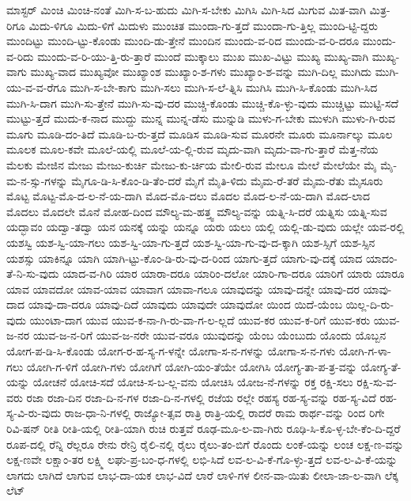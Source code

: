 {ಮಾಸ್ಟರ್
ಮಿಂಚಿ
ಮಿಂಚಿ-ನಂತೆ
ಮಿಗಿ-ಸ-ಬ-ಹುದು
ಮಿಗಿ-ಸ-ಬೇಕು
ಮಿಗಿಸಿ
ಮಿಗಿ-ಸಿದ
ಮಿಗುವ
ಮಿತ-ವಾಗಿ
ಮಿತ್ರ-ರಿಗೂ
ಮಿದು-ಳಿಗೂ
ಮಿದು-ಳಿಗೆ
ಮಿದುಳು
ಮುಂಚಿತ
ಮುಂದಾ-ಗು-ತ್ತದೆ
ಮುಂದಾ-ಗು-ತ್ತಿಲ್ಲ
ಮುಂದಿ-ಟ್ಟಿ-ದ್ದರು
ಮುಂದಿಟ್ಟು
ಮುಂದಿ-ಟ್ಟು-ಕೊಂಡು
ಮುಂದಿ-ಡು-ತ್ತೇನೆ
ಮುಂದಿನ
ಮುಂದು-ವ-ರಿದ
ಮುಂದು-ವ-ರಿ-ದರೂ
ಮುಂದು-ವ-ರಿದು
ಮುಂದು-ವ-ರಿ-ಯು-ತ್ತಿ-ರು-ತ್ತಾರೆ
ಮುಂದೆ
ಮುಕ್ಕಾಲು
ಮುಖ
ಮುಖ-ವಿಟ್ಟು
ಮುಖ್ಯ
ಮುಖ್ಯ-ವಾಗಿ
ಮುಖ್ಯ-ವಾಗು
ಮುಖ್ಯ-ವಾದ
ಮುಖ್ಯವೋ
ಮುಖ್ಯಾಂಶ
ಮುಖ್ಯಾಂ-ಶ-ಗಳು
ಮುಖ್ಯಾಂ-ಶ-ವನ್ನು
ಮುಗಿ-ದಿಲ್ಲ
ಮುಗಿದು
ಮುಗಿ-ಯು-ವ-ವ-ರೆಗೂ
ಮುಗಿ-ಸ-ಬೇ-ಕಾಗು
ಮುಗಿ-ಸಲು
ಮುಗಿ-ಸ-ಲೆ-ತ್ನಿಸಿ
ಮುಗಿಸಿ
ಮುಗಿ-ಸಿ-ಕೊಂಡು
ಮುಗಿ-ಸಿದ
ಮುಗಿ-ಸಿ-ದಾಗ
ಮುಗಿ-ಸು-ತ್ತೇನೆ
ಮುಗಿ-ಸು-ವು-ದರ
ಮುಚ್ಚಿ-ಕೊಂಡು
ಮುಚ್ಚಿ-ಕೊ-ಳ್ಳು-ವುದು
ಮುಚ್ಚಿಟ್ಟು
ಮುಟ್ಟಿ-ಸದೆ
ಮುಟ್ಟು-ತ್ತದೆ
ಮುದು-ಕ-ನಾದ
ಮುದ್ದು
ಮುನ್ನ
ಮುನ್ನ-ಡೆಸು
ಮುನ್ನುಡಿ
ಮುಳು-ಗ-ಬೇಕು
ಮುಳುಗಿ
ಮುಳು-ಗಿ-ರುವ
ಮೂಗು
ಮೂಡಿ-ದಂ-ತಿದೆ
ಮೂಡಿ-ಬ-ರು-ತ್ತದೆ
ಮೂಡಿಸ
ಮೂಡಿ-ಸುವ
ಮೂರನೇ
ಮೂರು
ಮೂರ್ನಾಲ್ಕು
ಮೂಲ
ಮೂಲಕ
ಮೂಲ-ಕವೇ
ಮೂಲೆ-ಯಲ್ಲಿ
ಮೂಲೆ-ಯ-ಲ್ಲಿ-ರುವ
ಮೃದು-ವಾಗಿ
ಮೃದು-ವಾ-ಗು-ತ್ತಾರೆ
ಮೆತ್ತ-ನೆಯ
ಮೆಲಕು
ಮೇಜಿನ
ಮೇಜು
ಮೇಜು-ಕುರ್ಚಿ
ಮೇಜು-ಕು-ರ್ಚಿಯ
ಮೇಲಿ-ರುವ
ಮೇಲೂ
ಮೇಲೆ
ಮೇಲೆಯೇ
ಮೈ
ಮೈ-ಮ-ನ-ಸ್ಸು-ಗಳನ್ನು
ಮೈಗೂ-ಡಿ-ಸಿ-ಕೊಂ-ಡಿ-ತೆಂ-ದರೆ
ಮೈಗೆ
ಮೈತಿ-ಳಿದು
ಮೈಮ-ರೆ-ತರೆ
ಮೈಮ-ರೆತು
ಮೈಸೂರು
ಮೊಟ್ಟ
ಮೊಟ್ಟ-ಮೊ-ದ-ಲ-ನೆ-ಯ-ದಾಗಿ
ಮೊದ-ಮೊ-ದಲು
ಮೊದಲ
ಮೊದ-ಲ-ನೆ-ಯ-ದಾಗಿ
ಮೊದ-ಲಾದ
ಮೊದಲು
ಮೊದಲೇ
ಮೊನೆ
ಮೋಹ-ದಿಂದ
ಮೌಲ್ಯ-ಮ-ಹತ್ತ್ವ
ಮೌಲ್ಯ-ವನ್ನು
ಯತ್ನಿ-ಸಿ-ದರೆ
ಯತ್ನಿಸು
ಯತ್ನಿ-ಸುವ
ಯದ್ಭಾವಂ
ಯದ್ವಾ-ತದ್ವಾ
ಯನ
ಯನಕ್ಕೆ
ಯನ್ನು
ಯನ್ನೂ
ಯರು
ಯಲು
ಯಲ್ಲಿ
ಯಲ್ಲಿ-ಡು-ವುದು
ಯಲ್ಲೇ
ಯವ-ರಲ್ಲಿ
ಯಶಸ್ವಿ
ಯಶ-ಸ್ವಿ-ಯಾ-ಗಲು
ಯಶ-ಸ್ವಿ-ಯಾ-ಗು-ತ್ತದೆ
ಯಶ-ಸ್ವಿ-ಯಾ-ಗು-ವು-ದ-ಕ್ಕಾಗಿ
ಯಶ-ಸ್ಸಿಗೆ
ಯಶ-ಸ್ಸಿನ
ಯಶಸ್ಸು
ಯಾಕಿನ್ನೂ
ಯಾಗಿ
ಯಾಗಿ-ಟ್ಟು-ಕೊಂ-ಡಿ-ರು-ವು-ದ-ರಿಂದ
ಯಾಗು-ತ್ತದೆ
ಯಾಗು-ವು-ದಕ್ಕೆ
ಯಾದ
ಯಾದಂ-ತೆ-ನಿ-ಸು-ವುದು
ಯಾದ-ವ-ಗಿರಿ
ಯಾರ
ಯಾರಾ-ದರೂ
ಯಾರಿಂ-ದಲೋ
ಯಾರಿ-ಗಾ-ದರೂ
ಯಾರಿಗೆ
ಯಾರು
ಯಾರೂ
ಯಾವ
ಯಾವದೋ
ಯಾವ-ಯಾವ
ಯಾವಾಗ
ಯಾವಾ-ಗಲೂ
ಯಾವುದನ್ನು
ಯಾವು-ದನ್ನೇ
ಯಾವು-ದರ
ಯಾವು-ದಾದ
ಯಾವು-ದಾ-ದರೂ
ಯಾವು-ದಿದೆ
ಯಾವುದು
ಯಾವುದೇ
ಯಾವುದೋ
ಯಿಂದ
ಯಿದೆ-ಯೆಂಬ
ಯಿಲ್ಲ-ದಿ-ರು-ವುದು
ಯುಂಟಾ-ದಾಗ
ಯುವ
ಯುವ-ಕ-ನಾ-ಗಿ-ರು-ವಾ-ಗ-ಲ-ಲ್ಲದೆ
ಯುವ-ಕರ
ಯುವ-ಕ-ರಿಗೆ
ಯುವ-ಕರು
ಯುವ-ಜ-ನರ
ಯುವ-ಜ-ನ-ರಿಗೆ
ಯುವ-ಜ-ನರೇ
ಯುವ-ವರೂ
ಯುವುದನ್ನು
ಯೆಂಬ
ಯೆಂಬುದು
ಯೊಂದು
ಯೊಬ್ಬನ
ಯೋಗ-ಪ-ಡಿ-ಸಿ-ಕೊಂಡು
ಯೋಗ-ರ-ಹ-ಸ್ಯ-ಗ-ಳನ್ನೇ
ಯೋಗಾ-ಸ-ನ-ಗಳನ್ನು
ಯೋಗಾ-ಸ-ನ-ಗಳು
ಯೋಗಿ-ಗ-ಳಾ-ಗಲು
ಯೋಗಿ-ಗ-ಳಿಗೆ
ಯೋಗಿ-ಗಳು
ಯೋಗಿಗೆ
ಯೋಗಿ-ಯಂ-ತೆಯೇ
ಯೋಗಿಸಿ
ಯೋಗ್ಯ-ತಾ-ಪ-ತ್ರ-ವನ್ನು
ಯೋಗ್ಯ-ತೆ-ಯನ್ನು
ಯೋಚನೆ
ಯೋಚಿ-ಸದೆ
ಯೋಚಿ-ಸ-ಬ-ಲ್ಲ-ವನು
ಯೋಚಿಸಿ
ಯೋಜ-ನೆ-ಗಳನ್ನು
ರಕ್ತ
ರಕ್ಷಿ-ಸಲು
ರಕ್ಷಿ-ಸು-ವ-ವರು
ರಜಾ
ರಜಾ-ದಿನ
ರಜಾ-ದಿ-ನ-ಗಳ
ರಜಾ-ದಿ-ನ-ಗಳಲ್ಲಿ
ರಜೆಯ
ರಲ್ಲೇ
ರಹಸ್ಯ
ರಹ-ಸ್ಯ-ವನ್ನು
ರಹ-ಸ್ಯ-ವಿದೆ
ರಹ-ಸ್ಯ-ವಿ-ರು-ವುದು
ರಾಜ-ಧಾ-ನಿ-ಗಳಲ್ಲಿ
ರಾಜ್ಯೋ-ತ್ಸವ
ರಾತ್ರಿ
ರಾತ್ರಿ-ಯಲ್ಲಿ
ರಾದರೆ
ರಾಮ
ರಾರ್ಥ-ವನ್ನು
ರಿಂದ
ರಿಗೇ
ರಿವಿ-ಷನ್
ರೀತಿ
ರೀತಿ-ಯಲ್ಲಿ
ರೀತಿ-ಯಾಗಿ
ರುಚಿ
ರುತ್ತವೆ
ರೂಢ-ಮೂ-ಲ-ವಾ-ಗಿರು
ರೂಢಿ-ಸಿ-ಕೊ-ಳ್ಳ-ಬೇ-ಕೆಂ-ದಿ-ದ್ದರೆ
ರೂಪ-ದಲ್ಲಿ
ರೆನ್ನಿ
ರೆಲ್ಲರೂ
ರೇನು
ರೇನ್ರಿ
ರೈಲಿ-ನಲ್ಲಿ
ರೈಲು
ರೈಲು-ತಂ-ಬಿಗೆ
ರೊಂದು
ಲಂಕೆ-ಯನ್ನು
ಲಂಚ
ಲಕ್ಷ-ಣ-ವನ್ನು
ಲಕ್ಷ-ಣವೇ
ಲಕ್ಷಾಂ-ತರ
ಲಕ್ಷ್ಮಿ
ಲಘು-ಪ್ರ-ಬಂ-ಧ-ಗಳಲ್ಲಿ
ಲಭಿ-ಸಿದೆ
ಲವ-ಲ-ವಿ-ಕೆ-ಗೊ-ಳ್ಳು-ತ್ತದೆ
ಲವ-ಲ-ವಿ-ಕೆ-ಯನ್ನು
ಲಾಗದು
ಲಾಗಿದೆ
ಲಾಗುವ
ಲಾಭ-ದಾ-ಯಕ
ಲಾಭ-ವಿದೆ
ಲಾರೆ
ಲಾಳಿ-ಗಳ
ಲೀನ-ವಾ-ಯಿತು
ಲೀಲಾ-ಜಾ-ಲ-ವಾಗಿ
ಲೆಕ್ಕ
ಲೆಟ್
}
